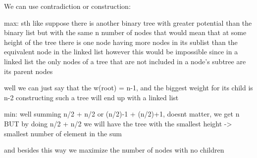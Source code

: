 We can use contradiction or construction:

max:
sth like suppose there is another binary tree with greater potential than the binary list but with the same n number of nodes that would mean that at some height of the tree there is one node having more nodes in its sublist than the equivalent node in the linked list however this would be impossible since in a linked list the only nodes of a tree that are not included in a node's subtree are its parent nodes

well we can just say that the w(root) = n-1, and the biggest weight for its child is n-2 constructing such a tree will end up with a linked list

min:
well summing n/2 + n/2 or (n/2)-1 + (n/2)+1, doesnt matter, we get n BUT by doing n/2 + n/2 we will have the tree with the smallest height -> smallest number of element in the sum

and besides this way we maximize the number of nodes with no children